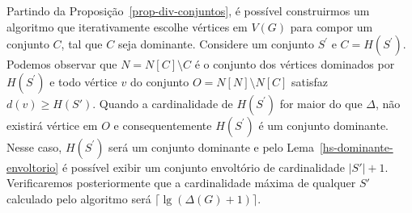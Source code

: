 







Partindo da Proposição~\ref{prop-div-conjuntos}, é possível construirmos um algoritmo que iterativamente escolhe vértices em $V(G)$ para compor um conjunto $C$, tal que $C$ seja dominante. Considere um conjunto $S^\prime$ e $C=H(S^\prime)$. Podemos observar que $N=N[C] \setminus C$ é o conjunto dos vértices dominados por $H(S^\prime)$ e todo vértice $v$ do conjunto $O=N[N] \setminus N[C]$ satisfaz $d(v)\geq H(S')$. Quando a cardinalidade de $H(S^\prime)$ for maior do que $\Delta$, não existirá vértice em $O$ e consequentemente $H(S^\prime)$ é um conjunto dominante. Nesse caso, $H(S^\prime)$ será um conjunto dominante e pelo Lema~\ref{hs-dominante-envoltorio} é possível exibir um conjunto envoltório de cardinalidade $|S'|+1$. Verificaremos posteriormente que a cardinalidade máxima de qualquer $S'$ calculado pelo algoritmo será $\Big\lceil \lg{(\Delta(G) + 1)} \Big\rceil$.



